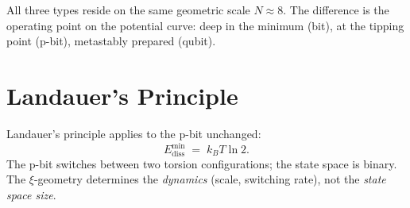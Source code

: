 	{\footnotesize
	\begin{center}
	\end{center}
	\begin{center}
	\end{center}
	}
	
	All three types reside on the same geometric scale $N \approx 8$.
	The difference is the operating point on the potential curve:
	deep in the minimum (bit), at the tipping point (p-bit), metastably prepared (qubit).
	
	\section{Landauer's Principle}
	\label{sec:landauer}
	
	Landauer's principle \cite{Landauer1961} applies to the p-bit unchanged:
	\begin{equation}
		E_\text{diss}^\text{min} \;=\; k_B T \ln 2.
		\label{eq:landauer}
	\end{equation}
	The p-bit switches between two torsion configurations; the
	state space is binary. The $\xi$-geometry determines the \emph{dynamics}
	(scale, switching rate), not the \emph{state space size}.
	
